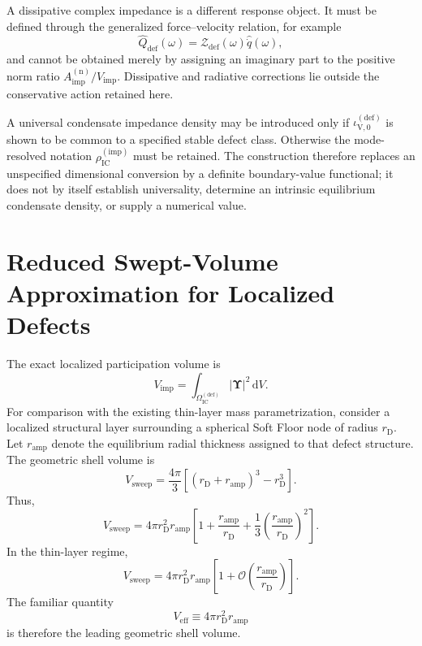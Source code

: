 A dissipative complex impedance is a different response object. It must be defined through the generalized force--velocity relation, for example
\begin{equation}
    \widehat{Q}_{\mathrm{def}}(\omega)=\mathcal{Z}_{\mathrm{def}}(\omega)\widehat{\dot{q}}(\omega),
\end{equation}
and cannot be obtained merely by assigning an imaginary part to the positive norm ratio $A_{\mathrm{imp}}^{(\mathrm{n})}/V_{\mathrm{imp}}$. Dissipative and radiative corrections lie outside the conservative action retained here.

A universal condensate impedance density may be introduced only if $\iota_{\mathrm{V},0}^{(\mathrm{def})}$ is shown to be common to a specified stable defect class. Otherwise the mode-resolved notation $\rho_{\mathrm{IC}}^{(\mathrm{imp})}$ must be retained. The construction therefore replaces an unspecified dimensional conversion by a definite boundary-value functional; it does not by itself establish universality, determine an intrinsic equilibrium condensate density, or supply a numerical value.

\section{Reduced Swept-Volume Approximation for Localized Defects}
\label{sec:AP_swept_volume}

The exact localized participation volume is
\begin{equation}
    V_{\mathrm{imp}}
    =
    \int_{\Omega_{\mathrm{IC}}^{(\mathrm{def})}}
    |\boldsymbol\Upsilon|^2\,\mathrm dV.
\end{equation}
For comparison with the existing thin-layer mass parametrization, consider a localized structural layer surrounding a spherical Soft Floor node of radius \(r_{\mathrm D}\). Let \(r_{\mathrm{amp}}\) denote the equilibrium radial thickness assigned to that defect structure. The geometric shell volume is
\begin{equation}
    V_{\mathrm{sweep}}
    =
    \frac{4\pi}{3}
    \left[
    (r_{\mathrm D}+r_{\mathrm{amp}})^3-r_{\mathrm D}^3
    \right].
\end{equation}
Thus,
\begin{equation}
    V_{\mathrm{sweep}}
    =
    4\pi r_{\mathrm D}^2r_{\mathrm{amp}}
    \left[
    1+
    \frac{r_{\mathrm{amp}}}{r_{\mathrm D}}
    +
    \frac{1}{3}
    \left(
    \frac{r_{\mathrm{amp}}}{r_{\mathrm D}}
    \right)^2
    \right].
\end{equation}
In the thin-layer regime,
\begin{equation}
    V_{\mathrm{sweep}}
    =
    4\pi r_{\mathrm D}^2r_{\mathrm{amp}}
    \left[
    1+\mathcal O
    \left(
    \frac{r_{\mathrm{amp}}}{r_{\mathrm D}}
    \right)
    \right].
\end{equation}
The familiar quantity
\begin{equation}
    V_{\mathrm{eff}}
    \equiv
    4\pi r_{\mathrm D}^2r_{\mathrm{amp}}
\end{equation}
is therefore the leading geometric shell volume.

